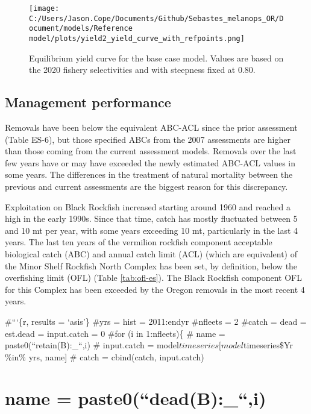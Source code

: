 \documentclass[11pt,
  english,
  letterpaper,
]{article}
\begin{document}
\begin{figure}
\centering
\texttt{[image: C:/Users/Jason.Cope/Documents/Github/Sebastes\_melanops\_OR/Document/models/Reference model/plots/yield2\_yield\_curve\_with\_refpoints.png]}
\caption{Equilibrium yield curve for the base case model. Values are based on the 2020 fishery selectivities and with steepness fixed at 0.80.\label{fig:es-yield}}
\end{figure}



\clearpage

\hypertarget{management-performance}{%
\subsection*{Management performance}\label{management-performance}}

Removals have been below the equivalent ABC-ACL since the prior assessment (Table ES-6), but those specified ABCs from the 2007 assessments are higher than those coming from the current assessment models. Removals over the last few years have or may have exceeded the newly estimated ABC-ACL values in some years. The differences in the treatment of natural mortality between the previous and current assessments are the biggest reason for this discrepancy.

Exploitation on Black Rockfish increased starting around 1960 and reached a high in the early 1990s. Since that time, catch has mostly fluctuated between 5 and 10 mt per year, with some years exceeding 10 mt, particularly in the last 4 years. The last ten years of the vermilion rockfish component acceptable biological catch (ABC) and annual catch limit (ACL) (which are equivalent) of the Minor Shelf Rockfish North Complex has been set, by definition, below the overfishing limit (OFL) (Table \ref{tab:ofl-es}). The Black Rockfish component OFL for this Complex has been exceeded by the Oregon removals in the most recent 4 years.

\#```\{r, results = `asis'\} \#yrs = hist = 2011:endyr \#nfleets = 2 \#catch = dead = est.dead = input.catch = 0 \#for (i in 1:nfleets)\{ \# name = paste0(``retain(B):\_``,i) \# input.catch = model\(timeseries[model\)timeseries\$Yr \%in\% yrs, name{]} \# catch = cbind(catch, input.catch)

\hypertarget{name-paste0deadb_i}{%
\section{name = paste0(``dead(B):\_``,i)}\label{name-paste0deadb_i}}
\end{document}
